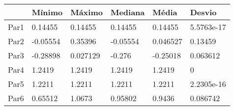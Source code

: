 \begin{tabular}{llllll}
& Mínimo & Máximo & Mediana & Média & Desvio \\ 
\hline 
Par1 & 0.14455 & 0.14455 & 0.14455 & 0.14455 & 5.5763e-17 \\ 
Par2 & -0.05554 & 0.35396 & -0.05554 & 0.046527 & 0.13459 \\ 
Par3 & -0.28898 & 0.027129 & -0.276 & -0.25018 & 0.063612 \\ 
Par4 & 1.2419 & 1.2419 & 1.2419 & 1.2419 & 0 \\ 
Par5 & 1.2211 & 1.2211 & 1.2211 & 1.2211 & 2.2305e-16 \\ 
Par6 & 0.65512 & 1.0673 & 0.95802 & 0.9436 & 0.086742 \\ 
\hline 
\end{tabular}